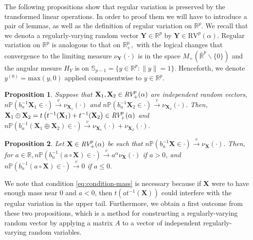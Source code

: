 \documentclass[11pt, oneside]{book}
\theoremstyle{plain}
\newtheorem{prop}{Proposition}[section]
\theoremstyle{remark}
\begin{document}
The following propositions show that regular variation is preserved by the
transformed linear operations. In order to proof them we will have to introduce
a pair of lemmas, as well as the definition of regular variation on
$\mathbb{R}^p.$ We recall that we denota a regularly-varying random vector
$\mathbf{Y}\in\mathbb{R}^p$ by $\mathbf{Y}\in\text{RV}^p(\alpha).$ Regular
variation on $\mathbb{R}^p$ is analogous to that on $\mathbb{R}^p_+,$ with the
logical changes that convergence to the limiting measure $\nu_\mathbf{Y}(\cdot)$
is in the space $M_+\left(\bar{\mathbb{R}}^p\backslash\{0\}\right)$ and the
angular mesure $H_Y$ is on $\mathbb{S}_{p-1} = \{y\in\mathbb{R}^{p}:\lVert
y\lVert=1\}.$ Henceforth, we denote $y^{(0)}=\text{max}(y,0)$ applied
componentwise to $y\in\mathbb{R}^p$.
\begin{prop}
    Suppose that $\mathbf{X}_1,\mathbf{X}_2\in\emph{RV}_+^p(\alpha)$ are
    independent random vectors, $n\mathbb{P}(b_n^{-1}\mathbf{X}_1\in\cdot)
    \xrightarrow{v}\nu_{\mathbf{X}_1}(\cdot)$ and
    $n\mathbb{P}(b_n^{-1}\mathbf{X}_2\in\cdot)
    \xrightarrow{v}\nu_{\mathbf{X}_2}(\cdot).$ Then,
    $\mathbf{X}_1\oplus\mathbf{X}_2 = t\left(t^{-1}(\mathbf{X}_1) +
    t^{-1}(\mathbf{X}_2\right)\in\emph{RV}^p_+(\alpha)$ and
    $n\mathbb{P}(b_n^{-1}(\mathbf{X}_1\oplus\mathbf{X}_2)\in\cdot)
    \xrightarrow{v}\nu_{\mathbf{X}_1}(\cdot) + \nu_{\mathbf{X}_2}(\cdot).$
\end{prop}
\begin{prop}
    Let $\mathbf{X}\in\emph{RV}_+^p(\alpha)$ be such that
    $n\mathbb{P}(b_n^{-1}\mathbf{X}\in\cdot)
    \xrightarrow{v}\nu_\mathbf{X}(\cdot).$ Then, for $a\in\mathbb{R},
    n\mathbb{P}(b_n^{-1}(a\circ\mathbf{X})\in\cdot) 
    \xrightarrow{v}a^\alpha\nu_\mathbf{X}(\cdot)$ if $a>0$, and
    $n\mathbb{P}(b_n^{-1}(a\circ\mathbf{X})\in\cdot) \xrightarrow{v}0$ if $a\leq
    0.$ 
\end{prop}    
We note that condition \ref{eq:condition-mass} is necessary because if
$\mathbf{X}$ were to have enough mass near 0 and $a<0$, then
$t\left(at^{-1}(\mathbf{X})\right)$ could interfere with the regular variation
in the upper tail. Furthermore, we obtain a first outcome from these two
propositions, which is a method for constructing a regularly-varying random
vector by applying a matrix $A$ to a vector of independent regularly-varying
random variables.
\end{document}
